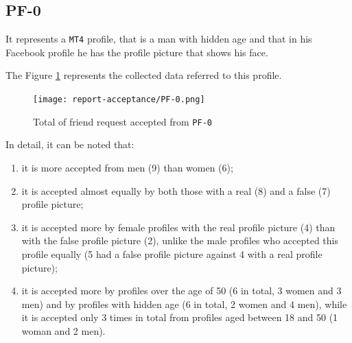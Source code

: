 \subsection*{PF-0}
It represents a \texttt{MT4} profile, that is a man with hidden age and that in his Facebook profile he has the profile picture that shows his face.
\par \noindent The Figure \ref{fig:accepted-from-PF0} represents the collected data referred to this profile. 
\begin{figure}[H]	
	\centering
	\texttt{[image: report-acceptance/PF-0.png]} 
	\caption{Total of friend request accepted from \texttt{PF-0}}
	\label{fig:accepted-from-PF0}
\end{figure}
\par \noindent
In detail, it can be noted that:
\begin{enumerate} 
	\item it is more accepted from men (9) than women (6);
	\item it is accepted almost equally by both those with a real (8) and a false (7) profile picture; 
	\item it is accepted more by female profiles with the real profile picture (4) than with the false profile picture (2), unlike the male profiles who accepted this profile equally (5 had a false profile picture against 4 with a real profile picture);
	\item it is accepted more by profiles over the age of 50 (6 in total, 3 women and 3 men) and by profiles with hidden age (6 in total, 2 women and 4 men), while it is accepted only 3 times in total from profiles aged between 18 and 50 (1 woman and 2 men).
\end{enumerate}


